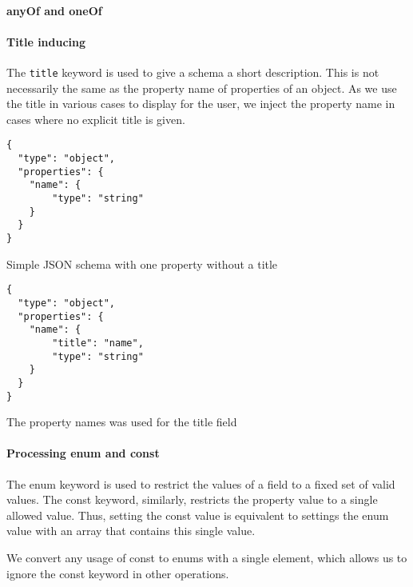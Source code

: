 \paragraph{anyOf and oneOf} %

\paragraph{Title inducing}

The \texttt{title} keyword is used to give a schema a short description.
This is not necessarily the same as the property name of properties of an object.
As we use the title in various cases to display for the user, we inject the property name in cases where no explicit title is given.

\begin{listing}[!h]
    \begin{verbatim}
{
  "type": "object",
  "properties": {
    "name": {
        "type": "string"
    }
  }
}
    \end{verbatim}
    \caption{Simple JSON schema with one property without a title}
    \label{listing:no-title}
\end{listing}

\begin{listing}[!h]
    \begin{verbatim}
{
  "type": "object",
  "properties": {
    "name": {
        "title": "name",
        "type": "string"
    }
  }
}
    \end{verbatim}
    \caption{The property names was used for the title field}
    \label{listing:with-title}
\end{listing}

\paragraph{Processing enum and const}
The enum keyword is used to restrict the values of a field to a fixed set of valid values.
The const keyword, similarly, restricts the property value to a single allowed value.
Thus, setting the const value is equivalent to settings the enum value with an array that contains this single value.

We convert any usage of const to enums with a single element, which allows us to ignore the const keyword in other operations.

